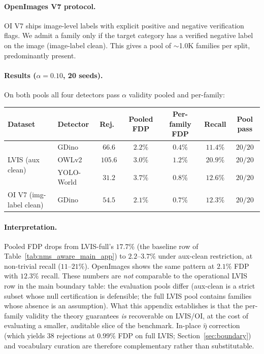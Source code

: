 \documentclass{article}
\theoremstyle{remark}
\newcommand{\1}{\mathbf{1}}
\begin{document}
\paragraph{OpenImages V7 protocol.}
OI V7 ships image-level labels with explicit positive and negative
verification flags. We admit a family only if the target category has
a verified negative label on the image (image-label clean). This gives
a pool of $\sim$1.0K families per split, predominantly present.

\paragraph{Results ($\alpha=0.10$, 20 seeds).}
On both pools all four detectors pass $\alpha$ validity pooled and
per-family:
\begin{center}\small
\begin{tabular*}{0.95\linewidth}{@{\extracolsep{\fill}}llccccc@{}}
\toprule
Dataset & Detector & Rej.\ & Pooled FDP & Per-family FDP & Recall & Pool pass \\
\midrule
\multirow{3}{*}{LVIS (aux clean)}
 & GDino       & $66.6$  & $2.2\%$ & $0.4\%$ & $11.4\%$ & $20/20$ \\
 & OWLv2       & $105.6$ & $3.0\%$ & $1.2\%$ & $20.9\%$ & $20/20$ \\
 & YOLO-World  & $31.2$  & $3.7\%$ & $0.8\%$ & $12.6\%$ & $20/20$ \\
\midrule
OI V7 (img-label clean) & GDino & $54.5$ & $2.1\%$ & $0.7\%$ & $12.3\%$ & $20/20$ \\
\bottomrule
\end{tabular*}
\end{center}

\paragraph{Interpretation.}
Pooled FDP drops from LVIS-full's $17.7\%$ (the baseline row of
Table~\ref{tab:nms_aware_main_app}) to $2.2$--$3.7\%$ under aux-clean
restriction, at non-trivial recall ($11$--$21\%$). OpenImages shows
the same pattern at $2.1\%$ FDP with $12.3\%$ recall. These numbers
are \emph{not} comparable to the operational LVIS row in the main
boundary table: the evaluation pools differ (aux-clean is a strict
subset whose null certification is defensible; the full LVIS pool
contains families whose absence is an assumption). What this appendix
establishes is that the per-family validity the theory guarantees
\emph{is} recoverable on LVIS/OI, at the cost of evaluating a smaller,
auditable slice of the benchmark.
In-place $\hat\eta$ correction (which yields 38 rejections at $0.99\%$
FDP on full LVIS; Section~\ref{sec:boundary}) and vocabulary curation
are therefore complementary rather than substitutable.
\end{document}
